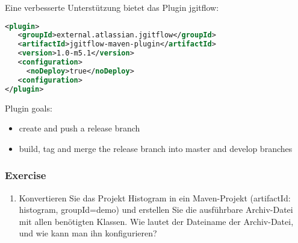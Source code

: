 Eine verbesserte Unterstützung bietet das Plugin jgitflow:
\begin{lstlisting}[language=xml,morekeywords={plugin,groupId,artifactId,configuration,noDeploy}]
<plugin>
   <groupId>external.atlassian.jgitflow</groupId>
   <artifactId>jgitflow-maven-plugin</artifactId>
   <version>1.0-m5.1</version>
   <configuration>
     <noDeploy>true</noDeploy>
   <configuration>
</plugin>
\end{lstlisting}
Plugin goals:
\begin{itemize}
\item {} create and push a release branch
\item {} build, tag and merge the release branch
into master and develop branches
\end{itemize}
\newslide
\subsubsection{Exercise}
\begin{enumerate}
\item Konvertieren Sie das Projekt Histogram in ein Maven-Projekt
(artifactId: histogram, groupId=demo) und
erstellen Sie die ausführbare Archiv-Datei mit allen benötigten Klassen.
Wie lautet der Dateiname der Archiv-Datei, und wie kann man ihn
konfigurieren?

\end{enumerate}
%
